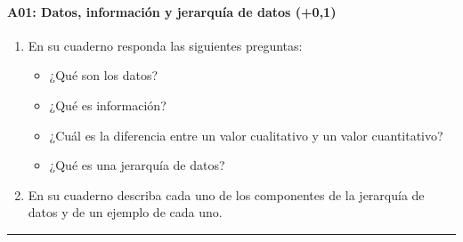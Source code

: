 \documentclass[letterpaper,10pt,spanish]{sphinxmanual}
\begin{document}
\paragraph{A01: Datos, información y jerarquía de datos (+0,1)}
\label{\detokenize{cursos/ofimatica11/periodo01/G01:a01-datos-informacion-y-jerarquia-de-datos-0-1}}
\sphinxAtStartPar
{}
\begin{enumerate}
%
\item {} 
\sphinxAtStartPar
En su cuaderno responda las siguientes preguntas:
\begin{itemize}
\item {} 
\sphinxAtStartPar
¿Qué son los datos?

\item {} 
\sphinxAtStartPar
¿Qué es información?

\item {} 
\sphinxAtStartPar
¿Cuál es la diferencia entre un valor cualitativo y un valor cuantitativo?

\item {} 
\sphinxAtStartPar
¿Qué es una jerarquía de datos?

\end{itemize}

\item {} 
\sphinxAtStartPar
En su cuaderno describa cada uno de los componentes de la jerarquía de datos y de un ejemplo de cada uno.

\end{enumerate}


\bigskip\hrule\bigskip
\end{document}

